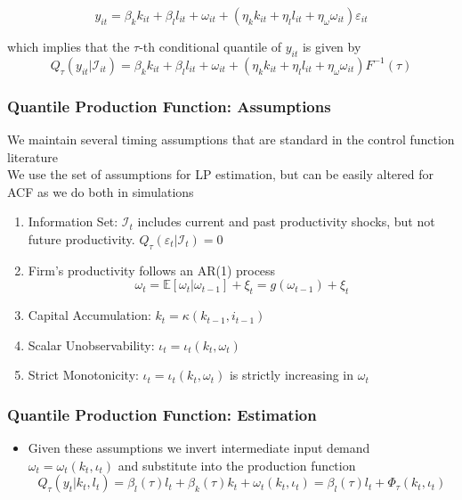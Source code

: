 \documentclass{beamer}
\begin{document}
\begin{frame}
\begin{itemize}
\begin{frame}
\begin{itemize}
	\begin{equation}
	 y_{it}=\beta_{k}k_{it}+\beta_{l}l_{it}+\omega_{it}+(\eta_{k}k_{it}+\eta_{l}l_{it}+\eta_{\omega}\omega_{it})\varepsilon_{it}
	\end{equation}
	
	which implies that the $\tau$-th conditional quantile of $y_{it}$ is given by
	\begin{equation}
	Q_{\tau}(y_{it}|\mathcal{I}_{it})=\beta_{k}k_{it}+\beta_{l}l_{it}+\omega_{it}+(\eta_{k}k_{it}+\eta_{l}l_{it}+\eta_{\omega}\omega_{it})F^{-1}(\tau)
	\end{equation}
\end{itemize}
\end{frame}

\begin{frame}
\frametitle{Quantile Production Function: Assumptions}
We maintain several timing assumptions that are standard in the control function literature\\

We use the set of assumptions for LP estimation, but can be easily altered for ACF as we do both in simulations\\


\begin{enumerate}
	\item Information Set: $\mathcal{I}_{t}$ includes current and past productivity shocks, but not future productivity. $Q_{\tau}(\varepsilon_{t}|\mathcal{I}_{t})=0$
	\item Firm's productivity follows an AR(1) process
	\begin{equation}
		\omega_{t}=\mathbb{E}[\omega_{t}|\omega_{t-1}]+\xi_{t}=g(\omega_{t-1})+\xi_{t}
	\end{equation}
	\item Capital Accumulation: $k_{t}=\kappa(k_{t-1}, i_{t-1})$
	\item Scalar Unobservability: $\iota_{t}=\iota_{t}(k_{t}, \omega_{t})$
	\item Strict Monotonicity: $\iota_{t}=\iota_{t}(k_{t}, \omega_{t})$ is strictly increasing in $\omega_{t}$
\end{enumerate}
\end{frame}


\begin{frame}
\frametitle{Quantile Production Function: Estimation}
\begin{itemize}
	\item Given these assumptions we invert intermediate input demand $\omega_{t}=\omega_{t}(k_{t}, \iota_{t})$ and substitute into the production function
	\begin{equation}
	Q_{\tau}(y_{t}|k_{t}, l_{t})=\beta_{l}(\tau)l_{t}+\beta_{k}(\tau)k_{t}+\omega_{t}(k_{t}, \iota_{t})=\beta_{l}(\tau)l_{t}+\Phi_{\tau}(k_{t}, \iota_{t})
	\end{equation}
	

\end{itemize}
\end{frame}
\end{itemize}
\end{frame}
\end{document}
